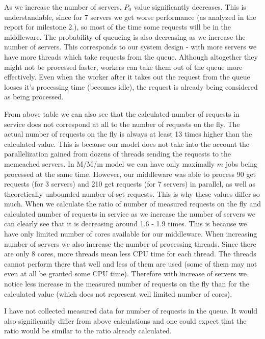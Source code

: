 \documentclass[11pt]{article}
\begin{document}
As we increase the number of servers, $P_0$ value significantly decreases. This is understandable, since for 7 servers we get worse performance (as analyzed in the report for milestone 2.), so most of the time some requests will be in the middleware.
The probability of queueing is also decreasing as we increase the number of servers. This corresponds to our system design - with more servers we have more threads which take requests from the queue. Although altogether they might not be processed faster, workers can take them out of the queue more effectively. Even when the worker after it takes out the request from the queue looses it's processing time (becomes idle), the request is already being considered as being processed. 

From above table we can also see that the calculated number of requests in service does not correspond at all to the number of requests on the fly. The actual number of requests on the fly is always at least 13 times higher than the calculated value. 
This is because our model does not take into the account the parallelization gained from dozens of threads sending the requests to the memcached servers. In M/M/m model we can have only maximally $m$ jobs being processed at the same time. However, our middleware was able to process 90 get requests (for 3 servers) and 210 get requests (for 7 servers) in parallel, as well as theoretically unbounded number of set requests. This is why these values differ so much. When we calculate the ratio of number of measured requests on the fly and calculated number of requests in service as we increase the number of servers we can clearly see that it is decreasing around 1.6 - 1.9 times. This is because we have only limited number of cores available for our middleware. When increasing number of servers we also increase the number of processing threads. Since there are only 8 cores, more threads mean less CPU time for each thread. The threads cannot perform there that well and less of them are used (some of them may not even at all be granted some CPU time). Therefore with increase of servers we notice less increase in the measured number of requests on the fly than for the calculated value (which does not represent well limited number of cores). 

 
I have not collected measured data for number of requests in the queue. It would also significantly differ from above calculations and one could expect that the ratio would be similar to the ratio already calculated.
\end{document}
